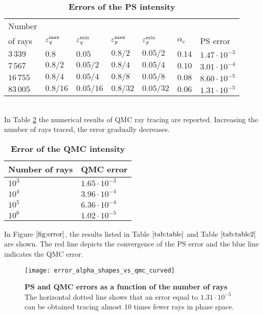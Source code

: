 \begin{table}[htbp] \label{tab:table}
\centering
\caption{\bf Errors of the PS intensity}
\begin{tabular}{lllllll}
 \hline  Number \\ of rays\;  & $\varepsilon^{\textrm{max}}_{\textit{q}} $  & $\varepsilon^{\textrm{min}}_{\textit{q}} $   \;     & $\varepsilon^{\textrm{max}}_{\textit{p}}$\;
  & $\varepsilon^{\textrm{min}}_{\textit{p}}$\; & $\alpha_\textrm{c}$  & PS error \\
  \hline 
 $3\,339$ & $0.8$  & $0.05$  & $0.8/2$  & $0.05/2$ & $0.14$ & $1.47\cdot10^{-3}$ \\
$7\,567$  & $0.8/2$  & $0.05/2$  & $0.8/4$  & $0.05/4$ & $0.10$ & $3.01\cdot 10^{-4}$  \\
$16\,755$  & $0.8/4$  & $0.05/4$  & $0.8/8$  & $0.05/8$ & $0.08$ & $8.60\cdot 10^{-5}$ \\
 $83\,005$ & $0.8/16$  & $0.05/16$  & $0.8/32$  & $0.05/32$ & $0.06$ & $1.31\cdot 10^{-5}$ \\
 \hline
 \end{tabular}
 \label{tab:table}
 \end{table}
\\ \indent In Table \ref{tab:table2} the numerical results of QMC ray tracing are reported.
Increasing the number of rays traced, the error gradually decreases.
\begin{table}[htbp]
\centering
\caption{\bf Error of the QMC intensity}
\begin{tabular}{ll} \hline   Number of rays\; & QMC error\\
 \hline $10^3$  & $1.65\cdot10^{-3}$ \\
$10^4$  & $3.96\cdot 10^{-4}$  \\
 $10^5$  & $6.36\cdot 10^{-4}$ \\ 
$10^6$  & $1.02\cdot 10^{-5}$ \\
 \hline
 \end{tabular}
 \label{tab:table2}
 \end{table}
\noindent In Figure $\ref{fig:error}$, the results listed in Table $\ref{tab:table}$ and Table $\ref{tab:table2}$ are shown. The red line depicts the convergence of the PS error and the blue line indicates the QMC error.
\begin{figure}[h]
  \begin{center}
  \texttt{[image: error\_alpha\_shapes\_vs\_qmc\_curved]}
  \end{center}
  \caption{\textbf{PS and QMC errors as a function of the number of rays}
  The horizontal dotted line shows that an error equal to $1.31\cdot  10^{-5}$ can be obtained tracing almost $10$ times fewer rays in phase space.}
  \label{fig:error}
\end{figure}
